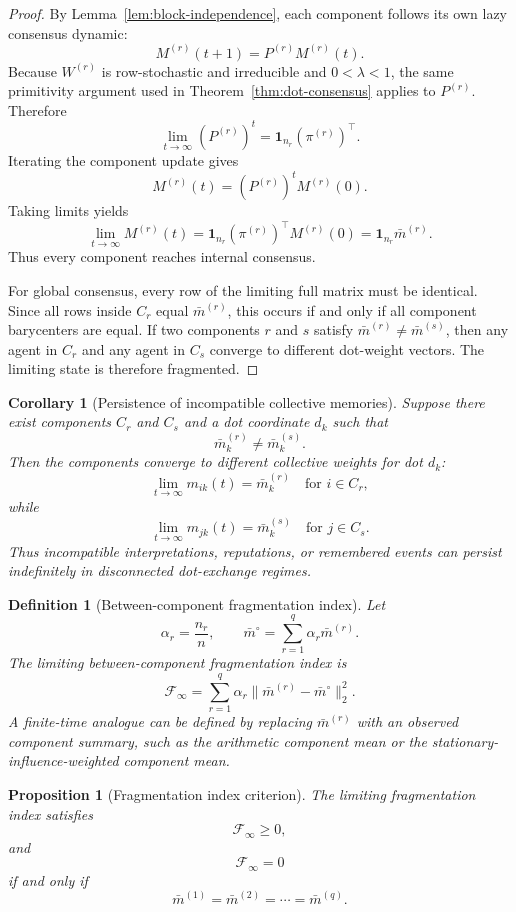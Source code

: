 \documentclass[11pt]{article}
\newtheorem{definition}{Definition}
\newtheorem{proposition}{Proposition}
\newtheorem{corollary}{Corollary}
\theoremstyle{remark}
\begin{document}
\begin{proof}
By Lemma~\ref{lem:block-independence}, each component follows its own
lazy consensus dynamic:
$$
M^{(r)}(t+1)=P^{(r)}M^{(r)}(t).
$$
Because $W^{(r)}$ is row-stochastic and irreducible and $0<\lambda<1$,
the same primitivity argument used in Theorem~\ref{thm:dot-consensus}
applies to $P^{(r)}$. Therefore
$$
\lim_{t\to\infty}(P^{(r)})^t=\mathbf{1}_{n_r}(\pi^{(r)})^\top.
$$
Iterating the component update gives
$$
M^{(r)}(t)=(P^{(r)})^tM^{(r)}(0).
$$
Taking limits yields
$$
\lim_{t\to\infty}M^{(r)}(t)
=\mathbf{1}_{n_r}(\pi^{(r)})^\top M^{(r)}(0)
=\mathbf{1}_{n_r}\bar m^{(r)}.
$$
Thus every component reaches internal consensus.

For global consensus, every row of the limiting full matrix must be
identical. Since all rows inside $C_r$ equal $\bar m^{(r)}$, this occurs
if and only if all component barycenters are equal. If two components
$r$ and $s$ satisfy $\bar m^{(r)}\neq\bar m^{(s)}$, then any agent in
$C_r$ and any agent in $C_s$ converge to different dot-weight vectors.
The limiting state is therefore fragmented.
\end{proof}

\begin{corollary}[Persistence of incompatible collective memories]
Suppose there exist components $C_r$ and $C_s$ and a dot coordinate
$d_k$ such that
$$
\bar m^{(r)}_k\neq \bar m^{(s)}_k.
$$
Then the components converge to different collective weights for dot
$d_k$:
$$
\lim_{t\to\infty}m_{ik}(t)=\bar m^{(r)}_k
\quad \text{for } i\in C_r,
$$
while
$$
\lim_{t\to\infty}m_{jk}(t)=\bar m^{(s)}_k
\quad \text{for } j\in C_s.
$$
Thus incompatible interpretations, reputations, or remembered events can
persist indefinitely in disconnected dot-exchange regimes.
\end{corollary}


\begin{definition}[Between-component fragmentation index]
Let
$$
\alpha_r=\frac{n_r}{n}, \qquad
\bar m^\circ=\sum_{r=1}^q \alpha_r\bar m^{(r)}.
$$
The limiting between-component fragmentation index is
$$
\mathcal{F}_\infty
=\sum_{r=1}^q \alpha_r\|\bar m^{(r)}-\bar m^\circ\|_2^2.
$$
A finite-time analogue can be defined by replacing $\bar m^{(r)}$ with
an observed component summary, such as the arithmetic component mean or
the stationary-influence-weighted component mean.
\end{definition}

\begin{proposition}[Fragmentation index criterion]\label{prop:frag-index}
The limiting fragmentation index satisfies
$$
\mathcal{F}_\infty\geq0,
$$
and
$$
\mathcal{F}_\infty=0
$$
if and only if
$$
\bar m^{(1)}=\bar m^{(2)}=\cdots=\bar m^{(q)}.
$$
\end{proposition}
\end{document}
